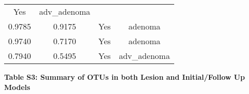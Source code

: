 \documentclass[12pt,]{article}
\begin{document}
\begin{longtable}[]{@{}cccc@{}}
\begin{minipage}[t]{0.22\columnwidth}
Yes\strut
\end{minipage} & \begin{minipage}[t]{0.16\columnwidth}\centering\strut
adv\_adenoma\strut
\end{minipage}\tabularnewline
\begin{minipage}[t]{0.24\columnwidth}\centering\strut
0.9785\strut
\end{minipage} & \begin{minipage}[t]{0.26\columnwidth}\centering\strut
0.9175\strut
\end{minipage} & \begin{minipage}[t]{0.22\columnwidth}\centering\strut
Yes\strut
\end{minipage} & \begin{minipage}[t]{0.16\columnwidth}\centering\strut
adenoma\strut
\end{minipage}\tabularnewline
\begin{minipage}[t]{0.24\columnwidth}\centering\strut
0.9740\strut
\end{minipage} & \begin{minipage}[t]{0.26\columnwidth}\centering\strut
0.7170\strut
\end{minipage} & \begin{minipage}[t]{0.22\columnwidth}\centering\strut
Yes\strut
\end{minipage} & \begin{minipage}[t]{0.16\columnwidth}\centering\strut
adenoma\strut
\end{minipage}\tabularnewline
\begin{minipage}[t]{0.24\columnwidth}\centering\strut
0.7940\strut
\end{minipage} & \begin{minipage}[t]{0.26\columnwidth}\centering\strut
0.5495\strut
\end{minipage} & \begin{minipage}[t]{0.22\columnwidth}\centering\strut
Yes\strut
\end{minipage} & \begin{minipage}[t]{0.16\columnwidth}\centering\strut
adv\_adenoma\strut
\end{minipage}\tabularnewline
\bottomrule
\end{longtable}

\newpage

\textbf{Table S3: Summary of OTUs in both Lesion and Initial/Follow Up
Models}
\end{document}
